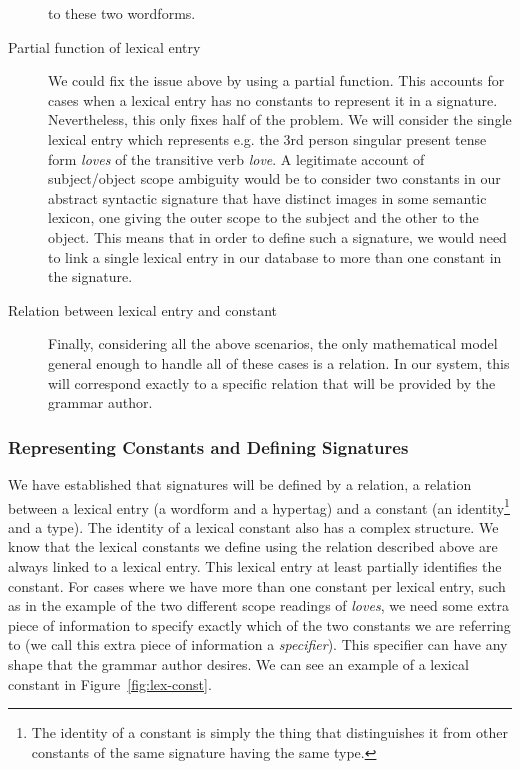 \begin{description}
    to these two wordforms.
  \item[Partial function of lexical entry] We could fix the issue above
    by using a partial function. This accounts for cases when a lexical
    entry has no constants to represent it in a signature. Nevertheless,
    this only fixes half of the problem. We will consider the single
    lexical entry which represents e.g. the 3rd person singular present
    tense form \emph{loves} of the transitive verb \emph{love}. A
    legitimate account of subject/object scope ambiguity would be to
    consider two constants in our abstract syntactic signature that have
    distinct images in some semantic lexicon, one giving the outer scope
    to the subject and the other to the object. This means that in order
    to define such a signature, we would need to link a single lexical
    entry in our database to more than one constant in the signature.
  \item[Relation between lexical entry and constant] Finally,
    considering all the above scenarios, the only mathematical model
    general enough to handle all of these cases is a relation. In our
    system, this will correspond exactly to a specific relation that
    will be provided by the grammar author.
\end{description}

\subsubsection{Representing Constants and Defining Signatures}

We have established that signatures will be defined by a relation, a
relation between a lexical entry (a wordform and a hypertag) and a
constant (an identity\footnote{The identity of a constant is simply the
  thing that distinguishes it from other constants of the same signature
  having the same type.} and a type). The identity of a lexical constant
also has a complex structure. We know that the lexical constants we
define using the relation described above are always linked to a lexical
entry. This lexical entry at least partially identifies the
constant. For cases where we have more than one constant per lexical
entry, such as in the example of the two different scope readings of
\emph{loves}, we need some extra piece of information to specify exactly
which of the two constants we are referring to (we call this extra piece
of information a \emph{specifier}). This specifier can have any shape
that the grammar author desires. We can see an example of a lexical
constant in Figure~\ref{fig:lex-const}.


